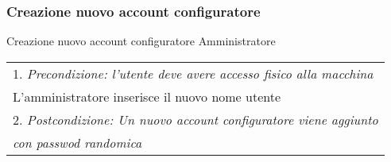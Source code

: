 \begin{minipage}{\textwidth}
    \subsubsection{Creazione nuovo account configuratore}
    \usecase
        {Creazione nuovo account configuratore}
        {Amministratore}
        {
            \begin{tabular}{l}
                1. \textit{Precondizione: l'utente deve avere accesso fisico alla macchina}\\
                L'amministratore inserisce il nuovo nome utente\\
                2. \textit{Postcondizione: Un nuovo account configuratore viene aggiunto} \\
                \textit{con passwod randomica}
            \end{tabular} \\
        }
        \vspace{0.5cm}
\end{minipage}